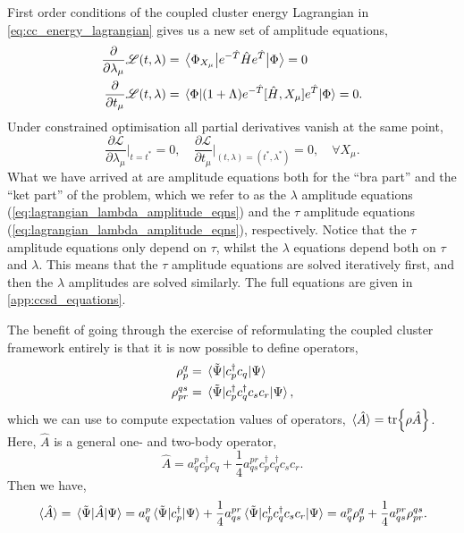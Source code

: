 First order conditions of the coupled cluster energy Lagrangian in
\autoref{eq:cc_energy_lagrangian} gives us a new set of amplitude equations,
\begin{align}
    \label{eq:lagrangian_tau_amplitude_eqns}
    \frac{\partial}{\partial \lambda_\mu} \mathscr{L}(t, \lambda)
    &= \mel{\Phi_{X_\mu}}{e^{-\hat{T}}\hat{H}e^{\hat{T}} }{\Phi} = 0 \\
    \label{eq:lagrangian_lambda_amplitude_eqns} 
    \frac{\partial}{\partial t_\mu} \mathscr{L}(t, \lambda)
    &= \mel{\Phi}{(1 + \Lambda)e^{-\hat{T}}[\hat{H}, X_\mu]e^{\hat{T}} }{\Phi} = 0.
\end{align}
Under constrained optimisation all partial derivatives vanish at the same point,
\begin{equation}
    \frac{\partial \mathscr{L}}{\partial \lambda_\mu}\Big\lvert_{t=t^*} = 0,
    \quad
    \frac{\partial \mathscr{L}}{\partial t_\mu}\Big\lvert_{(t,\lambda)=(t^*,\lambda^*)} = 0,
    \quad \forall X_\mu.
\end{equation}
What we have arrived at are amplitude equations both for the ``bra part'' and the 
``ket part'' of the problem, which we refer to as the $\lambda$ amplitude equations
(\autoref{eq:lagrangian_lambda_amplitude_eqns}) and 
the $\tau$ amplitude equations
(\autoref{eq:lagrangian_lambda_amplitude_eqns}), respectively. Notice that the $\tau$ amplitude equations 
only depend on $\tau$, whilst the $\lambda$ equations depend both on $\tau$ and $\lambda$.
This means that the $\tau$ amplitude equations are solved iteratively first, and then 
the $\lambda$ amplitudes are solved similarly.
The full equations are given in \autoref{app:ccsd_equations}.

The benefit of going through the exercise of reformulating the coupled cluster framework entirely
is that it is now possible to define operators,
\begin{align}
    \rho^q_p &= \mel*{\tilde{\Psi}}{c^\dagger_p c_q}{\Psi} \\
    \rho^{qs}_{pr} &= \mel*{\tilde{\Psi}}{c^\dagger_p c^\dagger_q c_s c_r}{\Psi},
\end{align}
which we can use to compute expectation values of operators,
$\ev*{\hat{A}} = \tr{\rho\hat{A}}$. Here, $\hat{A}$ is a general one- and two-body 
operator,
\begin{equation}
    \hat{A} = 
        a^p_qc^\dagger_p c_q 
        + \frac{1}{4}a^{pr}_{qs}c^\dagger_p c^\dagger_q c_s c_r.
\end{equation}
Then we have,
\begin{equation}
    \ev*{\hat{A}} = \mel*{\tilde{\Psi}}{\hat{A}}{\Psi}
        = a^p_q \mel*{\tilde{\Psi}}{c^\dagger_p}{\Psi}
        + \frac{1}{4} a^{pr}_{qs}
            \mel*{\tilde{\Psi}}{c^\dagger_p c^\dagger_q c_s c_r}{\Psi}
        = a^p_q \rho^q_p + \frac{1}{4} a^{pr}_{qs} \rho^{qs}_{pr}.
\end{equation}

